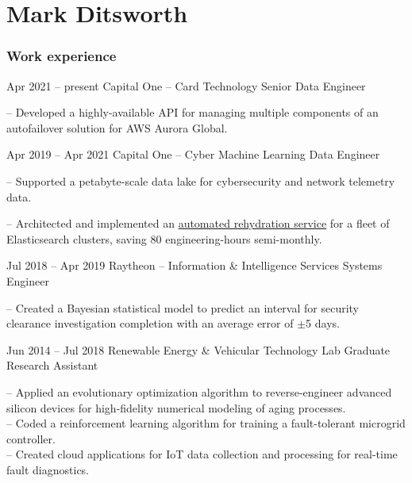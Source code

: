 \documentclass{tccv}
\begin{document}
\part{Mark Ditsworth}

\section{Work experience}

\begin{eventlist}
\item {Apr 2021 -- present}
	{Capital One -- Card Technology}
	{Senior Data Engineer}

-- Developed a highly-available API for managing multiple components of an autofailover solution for AWS Aurora Global. 

\item{Apr 2019 -- Apr 2021}
    {Capital One -- Cyber Machine Learning}
    {Data Engineer}
    
-- Supported a petabyte-scale data lake for cybersecurity and network telemetry data.

-- Architected and implemented an \href{https://www.youtube.com/watch?v=-hUjtAmHwyk}{automated rehydration service} for a fleet of Elasticsearch clusters, saving 80 engineering-hours semi-monthly.

\item{Jul 2018 -- Apr 2019}
    {Raytheon -- Information \& Intelligence Services}
    {Systems Engineer}
    
-- Created a Bayesian statistical model to predict an interval for security clearance investigation completion with an average
error of $\pm$5 days.

\item{Jun 2014 -- Jul 2018}
     {Renewable Energy \& Vehicular Technology Lab}
     {Graduate Research Assistant}

-- Applied an evolutionary optimization algorithm to reverse-engineer advanced
silicon devices for high-fidelity numerical modeling of aging processes.\\
-- Coded a reinforcement learning algorithm for training a fault-tolerant
microgrid controller.\\
-- Created cloud applications for IoT data collection
and processing for real-time fault diagnostics.


\end{eventlist}
\end{document}
